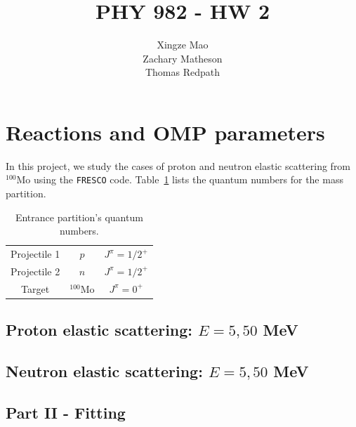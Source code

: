 \documentclass[]{scrartcl}
\title{PHY 982 - HW 2}
\author{Xingze Mao \\ Zachary Matheson \\ Thomas Redpath}
\date{}
\begin{document}
\maketitle

\section*{Reactions and OMP parameters}

In this project, we study the cases of proton and neutron elastic scattering from $ ^{100} \mathrm{Mo} $ using the \texttt{FRESCO} code. Table~\ref{tab:entrance} lists the quantum numbers for the mass partition.




\begin{table}
\centering
	\begin{tabular}{ | c | c  c | }
\hline
	Projectile 1 & $p$ & $ J ^{\pi} = 1/2 ^+ $ \\
	Projectile 2 & $n$ & $ J ^{\pi} = 1/2 ^+ $ \\
\hline
	Target & $ ^{100} \mathrm{Mo} $ & $ J ^{\pi} = 0 ^+ $ \\
\hline
	\end{tabular}
	\caption{Entrance partition's quantum numbers.}
	\label{tab:entrance}
\end{table}

\subsection*{Proton elastic scattering: $E=5,50$ MeV}

\subsection*{Neutron elastic scattering: $E=5,50$ MeV}

\subsection*{Part II - Fitting}
\end{document}

